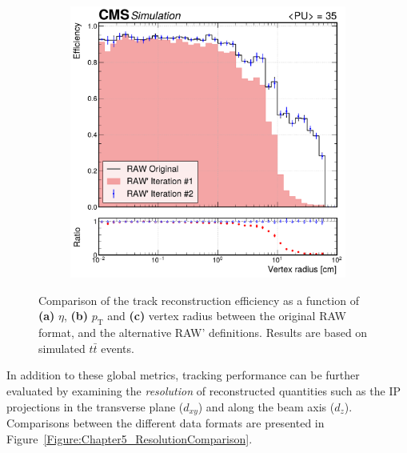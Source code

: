 \begin{figure}[!htbp]
        \begin{subfigure}{0.49\textwidth}
            \centering
            \includegraphics[width=\textwidth]{Figures/Chapter5/efficiency_comparison_2_vertpos.pdf}
            \caption{}
        \end{subfigure}
    \caption[Comparison of the track reconstruction efficiency as a function of $\eta$ and $p_\mathrm{T}$ between the original RAW format, and the alternative RAW' definitions.]{Comparison of the track reconstruction efficiency as a function of \textbf{(a)} $\eta$, \textbf{(b)} $p_\mathrm{T}$ and \textbf{(c)} vertex radius between the original RAW format, and the alternative RAW' definitions. Results are based on simulated $t\bar{t}$ events.} 
    \label{Figure:Chapter5_TrackingPerformance_2}
\end{figure}

In addition to these global metrics, tracking performance can be further evaluated by
examining the \textit{resolution} of reconstructed quantities such as the \ac{IP} projections in the transverse plane ($d_{xy}$) and along the beam axis ($d_z$). Comparisons between the different data formats are presented in Figure~\ref{Figure:Chapter5_ResolutionComparison}.

